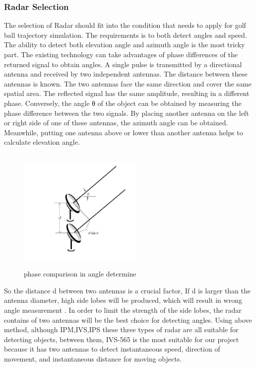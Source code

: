 \subsubsection{Radar Selection}
The selection of Radar should fit into the condition that needs to apply for golf ball trajectory simulation. The requirements is to both detect angles and speed. The ability to detect both elevation angle and azimuth angle is the most tricky part. The existing technology can take advantages of phase differences of the returned signal to obtain angles.
A single pulse is transmitted by a directional antenna and received by two independent antennas. The distance between these antennas is known. The two antennas face the same direction and cover the same spatial area. The reflected signal has the same amplitude, resulting in a different phase.
Conversely, the angle θ of the object can be obtained by measuring the phase difference between the two signals. By placing another antenna on the left or right side of one of these antennas, the azimuth angle can be obtained. Meanwhile, putting one antenna above or lower than another antenna helps to calculate elevation angle.
\begin{figure}[H]
    \centering
    \includegraphics[width=6cm,height=6cm]{figure/phase comparison in angle determine .jpg}
    \caption{phase comparison in angle determine}
\end{figure}
So the distance d between two antennas is a crucial factor, If d is larger than the antenna diameter, high side lobes will be produced, which will result in wrong angle measurement . In order to limit the strength of the side lobes, the radar contains of two antennas will be the best choice for detecting angles.
Using above method, although IPM,IVS,IPS these three types of radar are all suitable for detecting objects, between them, IVS-565 is the most suitable for our project because it has two antennas to detect instantaneous speed, direction of movement, and instantaneous distance for moving objects. 
